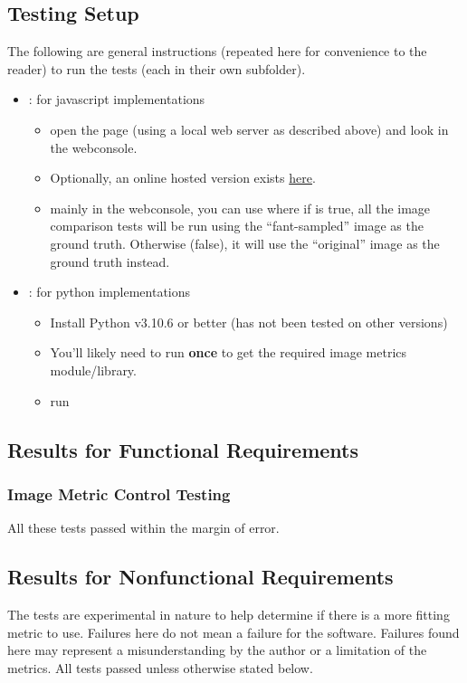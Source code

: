 \documentclass[12pt, titlepage]{article}
\begin{document}
\subsection{Testing Setup}
The following are general instructions (repeated here for convenience to the reader)
to run the tests (each in their own subfolder).
\begin{itemize}
  \item {}: for javascript implementations
  \begin{itemize}
    \item open the  page (using a local web server as described above)
      and look in the webconsole.
    \item Optionally, an online hosted version exists
    \href{https://joedf.github.io/ImgBeamer/tests/image_metrics/js-tests/}{here}.
    \item mainly in the webconsole, you can use  where if 
      is true, all the image comparison tests will be run using the ``fant-sampled'' image \cite{fant_1986} as
      the ground truth. Otherwise (false), it will use the ``original'' image as the ground truth instead.
  \end{itemize}
  \item {}: for python implementations
  \begin{itemize}
    \item Install Python v3.10.6 or better (has not been tested on other versions)
    \item You'll likely need to run  \textbf{once} to get the required
      image metrics module/library.
    \item run 
  \end{itemize}
\end{itemize}

\subsection{Results for Functional Requirements}
\subsubsection{Image Metric Control Testing}
All these tests passed within the margin of error.

\subsection{Results for Nonfunctional Requirements}
The tests are experimental in nature to help determine if there is a more fitting
metric to use. Failures here do not mean a failure for the software.
Failures found here may represent a misunderstanding by the author or a limitation of the metrics.
All tests passed unless otherwise stated below.
\end{document}
